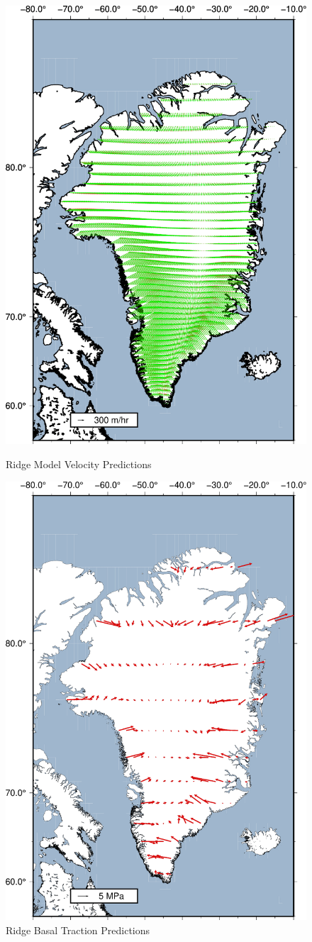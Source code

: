 \documentclass{article}
\begin{document}
\begin{figure}[!htb]
   \begin{minipage}{0.48\textwidth}
     \centering
     \includegraphics[width=.7\linewidth]{Ridge_pred_REAL.pdf}
     \caption{Ridge Model Velocity Predictions}\label{Fig:Data4}
   \end{minipage}\hfill
   \begin{minipage}{0.48\textwidth}
     \centering
     \includegraphics[width=.7\linewidth]{figures/greenland_traction_Ridge_0.15199.pdf}
     \caption{Ridge Basal Traction Predictions}\label{Fig:Data5}
   \end{minipage}
\end{figure}
\end{document}
